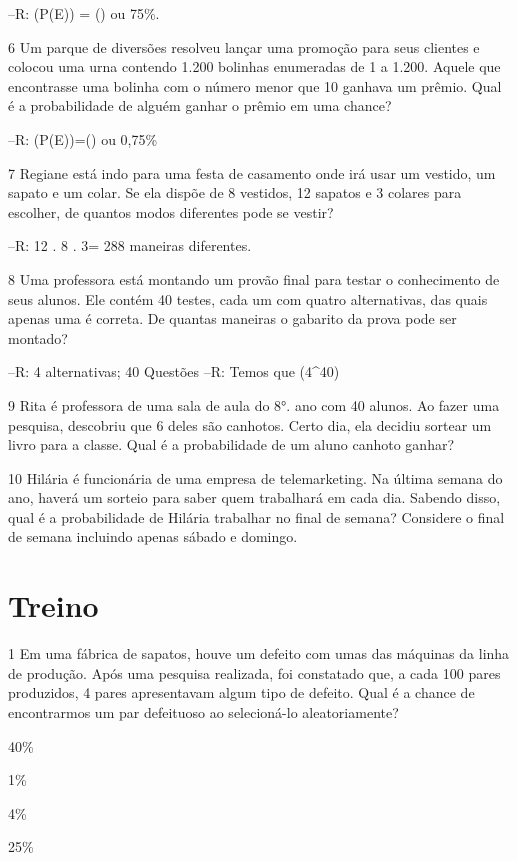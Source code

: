 {--R: (P(E)) = () ou 75\%.

\num{6} Um parque de diversões resolveu lançar uma promoção para seus
clientes e colocou uma urna contendo 1.200 bolinhas enumeradas de 1 a
1.200. Aquele que encontrasse uma bolinha com o número menor que 10
ganhava um prêmio. Qual é a probabilidade de alguém ganhar o prêmio em
uma chance?

--R: (P(E))=() ou 0,75\%

\num{7} Regiane está indo para uma festa de casamento onde irá usar um
vestido, um sapato e um colar. Se ela dispõe de 8 vestidos, 12 sapatos e
3 colares para escolher, de quantos modos diferentes pode se vestir?

--R: 12 . 8 . 3= 288 maneiras diferentes.

\num{8} Uma professora está montando um provão final para testar o
conhecimento de seus alunos. Ele contém 40 testes, cada um com quatro
alternativas, das quais apenas uma é correta. De quantas maneiras o
gabarito da prova pode ser montado?

--R: 4 alternativas; 40 Questões
--R: Temos que (4^{40})

\num{9} Rita é professora de uma sala de aula do 8°. ano com 40 alunos. Ao
fazer uma pesquisa, descobriu que 6 deles são canhotos. Certo dia, ela
decidiu sortear um livro para a classe. Qual é a probabilidade de um
aluno canhoto ganhar?


\num{10} Hilária é funcionária de uma empresa de telemarketing. Na última
semana do ano, haverá um sorteio para saber quem trabalhará em cada dia.
Sabendo disso, qual é a probabilidade de Hilária trabalhar no final de
semana? Considere o final de semana incluindo apenas sábado e domingo.


\section{Treino}

\num{1} Em uma fábrica de sapatos, houve um defeito com umas das máquinas da
linha de produção. Após uma pesquisa realizada, foi constatado que, a
cada 100 pares produzidos, 4 pares apresentavam algum tipo de defeito.
Qual é a chance de encontrarmos um par defeituoso ao selecioná-lo
aleatoriamente?
\item 40\%
\item 1\%
\item 4\%
\item 25\%

}
